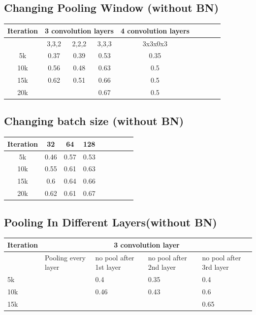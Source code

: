 \documentclass[journal,onecolumn]{IEEEtran}
\begin{document}
\subsection{Changing Pooling Window (without BN)}
\begin{tabular}{*9c}
  \hline
Iteration & \multicolumn{3}{c}{3 convolution layers} & \multicolumn{1}{c}{4 convolution layers} \\
\hline
{} & 3,3,2 & 2,2,2 & 3,3,3 & 3x3x0x3 \\
\hline
5k & 0.37 & 0.39 & 0.53 & 0.35 \\
10k & 0.56 & 0.48 & 0.63 & 0.5 \\
15k & 0.62 & 0.51 & 0.66 & 0.5 \\
20k & {} & {} & 0.67 & 0.5 \\
\hline
\end{tabular}

\subsection{Changing batch size (without BN)}
\begin{tabular}{*9c}
  \hline
Iteration & 32 & 64 & 128\\
\hline
5k & 0.46 & 0.57 & 0.53 \\
10k & 0.55 & 0.61 & 0.63 \\
15k & 0.6 & 0.64 & 0.66 \\
20k & 0.62 & 0.61 & 0.67 \\
\hline
\end{tabular}

\subsection{Pooling In Different Layers(without BN)}
\begin{tabular}{*5{p{2cm}}}
  \hline
  Iteration & \multicolumn{4}{c}{3 convolution layer} \\
  \hline
  {} & Pooling every layer & no pool after 1st layer & no pool after 2nd layer & no pool after 3rd layer \\
  \hline
  5k & {} & 0.4 & 0.35 & 0.4 \\
  10k & {} & 0.46 & 0.43 & 0.6 \\
  15k & {} & {} & {} & 0.65 \\
  \hline
\end{tabular}
\end{document}
